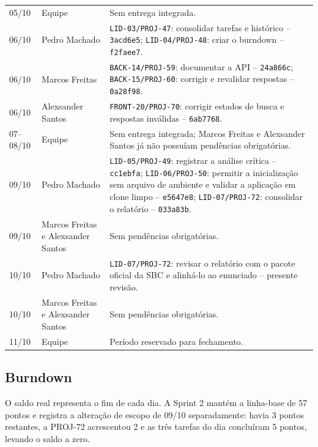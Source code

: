 \documentclass[12pt]{article}
\newcommand{\code}[1]{\texttt{#1}}
\begin{document}
\begin{longtable}{P{1.35cm}P{3.8cm}P{9.15cm}}
05/10 & Equipe & Sem entrega integrada. \\
06/10 & Pedro Machado & \code{LID-03/PROJ-47}: consolidar tarefas e histórico -- \code{3acd6e5}; \code{LID-04/PROJ-48}: criar o burndown -- \code{f2faee7}. \\
06/10 & Marcos Freitas & \code{BACK-14/PROJ-59}: documentar a API -- \code{24a866c}; \code{BACK-15/PROJ-60}: corrigir e revalidar respostas -- \code{0a28f98}. \\
06/10 & Alexsander Santos & \code{FRONT-20/PROJ-70}: corrigir estados de busca e respostas inválidas -- \code{6ab7768}. \\
07--08/10 & Equipe & Sem entrega integrada; Marcos Freitas e Alexsander Santos já não possuíam pendências obrigatórias. \\
09/10 & Pedro Machado & \code{LID-05/PROJ-49}: registrar a análise crítica -- \code{cc1ebfa}; \code{LID-06/PROJ-50}: permitir a inicialização sem arquivo de ambiente e validar a aplicação em clone limpo -- \code{e5647e8}; \code{LID-07/PROJ-72}: consolidar o relatório -- \code{033a83b}. \\
09/10 & Marcos Freitas e Alexsander Santos & Sem pendências obrigatórias. \\
10/10 & Pedro Machado & \code{LID-07/PROJ-72}: revisar o relatório com o pacote oficial da SBC e alinhá-lo ao enunciado -- presente revisão. \\
10/10 & Marcos Freitas e Alexsander Santos & Sem pendências obrigatórias. \\
11/10 & Equipe & Período reservado para fechamento. \\
\bottomrule
\end{longtable}
\normalsize

\subsection{Burndown}

O saldo real representa o fim de cada dia. A Sprint 2 mantém a linha-base de
57 pontos e registra a alteração de escopo de 09/10 separadamente: havia 3
pontos restantes, a PROJ-72 acrescentou 2 e as três tarefas do dia concluíram
5 pontos, levando o saldo a zero.
\end{document}
